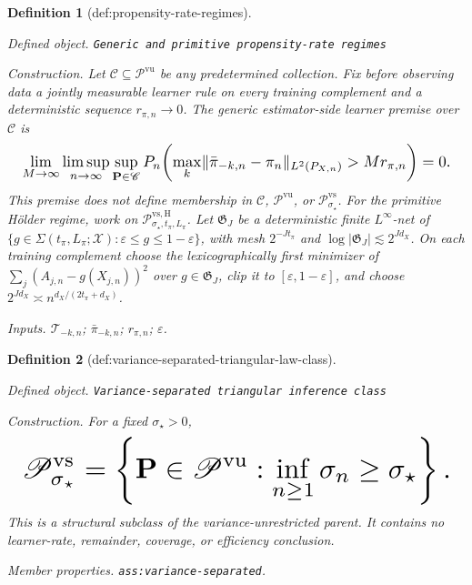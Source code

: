 \documentclass{article}
\newtheorem{definition}{Definition}
\begin{document}
\begin{definition}[def:propensity-rate-regimes]\label{def:propensity-rate-regimes}
\par\smallskip\noindent\emph{Defined object.} \texttt{Generic and primitive propensity-\allowbreak{}rate regimes}
\par\smallskip\noindent\emph{Construction.} Let \(\mathscr C\subseteq\mathscr P^{\mathrm{vu}}\) be any predetermined collection.  Fix before observing data a jointly measurable learner rule on every training complement and a deterministic sequence \(r_{\pi,n}\to0\).  The generic estimator-side learner premise over \(\mathscr C\) is
\[
\makebox[\linewidth][c]{\resizebox{0.98\linewidth}{!}{\(\displaystyle \lim_{M\to\infty}\limsup_{n\to\infty}\sup_{\mathbf P\in\mathscr C}
P_n\!\left(\max_k\lVert\bar\pi_{-k,n}-\pi_n\rVert_{L^2(P_{X,n})}>Mr_{\pi,n}\right)=0.\)}}
\]
This premise does not define membership in \(\mathscr C\), \(\mathscr P^{\mathrm{vu}}\), or \(\mathscr P^{\mathrm{vs}}_{\sigma_\star}\).  For the primitive H\"older regime, work on \(\mathscr P^{\mathrm{vs,H}}_{\sigma_\star,t_\pi,L_\pi}\).  Let \(\mathfrak G_J\) be a deterministic finite \(L^\infty\)-net of \(\{g\in\Sigma(t_\pi,L_\pi;\mathcal X):\varepsilon\le g\le1-\varepsilon\}\), with mesh \(2^{-Jt_\pi}\) and \(\log|\mathfrak G_J|\lesssim2^{Jd_X}\).  On each training complement choose the lexicographically first minimizer of \(\sum_j(A_{j,n}-g(X_{j,n}))^2\) over \(g\in\mathfrak G_J\), clip it to \([\varepsilon,1-\varepsilon]\), and choose \(2^{Jd_X}\asymp n^{d_X/(2t_\pi+d_X)}\).
\par\smallskip\noindent\emph{Inputs.} \(\mathcal T_{-k,n}\); \(\bar\pi_{-k,n}\); \(r_{\pi,n}\); \(\varepsilon\).
\end{definition}

\begin{definition}[def:variance-separated-triangular-law-class]\label{def:variance-separated-triangular-law-class}
\par\smallskip\noindent\emph{Defined object.} \texttt{Variance-\allowbreak{}separated triangular inference class}
\par\smallskip\noindent\emph{Construction.} For a fixed \(\sigma_\star>0\),
\[
\makebox[\linewidth][c]{\resizebox{0.98\linewidth}{!}{\(\displaystyle \mathscr P^{\mathrm{vs}}_{\sigma_\star}
=\left\{\mathbf P\in\mathscr P^{\mathrm{vu}}:\inf_{n\ge1}\sigma_n\ge\sigma_\star\right\}.\)}}
\]
This is a structural subclass of the variance-unrestricted parent.  It contains no learner-rate, remainder, coverage, or efficiency conclusion.
\par\smallskip\noindent\emph{Member properties.} \texttt{ass:\allowbreak{}variance-\allowbreak{}separated}.
\end{definition}
\end{document}
